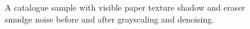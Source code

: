 \documentclass{article}
\begin{document}
\begin{figure}[h]
    \centering
    \caption{A catalogue sample with visible paper texture shadow and eraser smudge noise before and after grayscaling and denoising.}
    \label{image:noise}
\end{figure}

\end{document}
